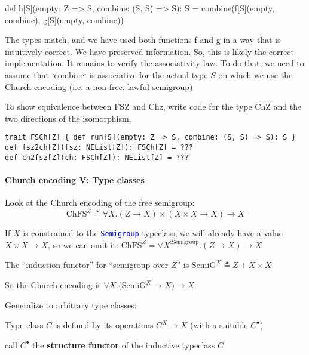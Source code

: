 def h{[}S{]}(empty: Z => S, combine: (S, S) => S): S = combine(f{[}S{]}(empty,
combine), g{[}S{]}(empty, combine))

The types match, and we have used both functions f and g in a way
that is intuitively correct. We have preserved information. So, this
is likely the correct implementation. It remains to verify the associativity
law. To do that, we need to assume that `combine` is associative for
the actual type $S$ on which we use the Church encoding (i.e. a non-free,
lawful semigroup)

To show equivalence between FSZ and Chz, write code for the type ChZ
and the two directions of the isomorphism,
\begin{lstlisting}
trait FSCh[Z] { def run[S](empty: Z => S, combine: (S, S) => S): S }
def fsz2ch[Z](fsz: NEList[Z]): FSCh[Z] = ???
def ch2fsz[Z](ch: FSCh[Z]): NEList[Z] = ???
\end{lstlisting}

\paragraph{Church encoding V: Type classes}

Look at the Church encoding of the free semigroup:{\footnotesize{}
\[
\text{ChFS}^{Z}\triangleq\forall X.\left(Z\rightarrow X\right)\times\left(X\times X\rightarrow X\right)\rightarrow X
\]
}{\footnotesize\par}

If $X$ is constrained to the \texttt{\textcolor{blue}{\footnotesize{}Semigroup}}
typeclass, we will already have a value {\footnotesize{}$X\times X\rightarrow X$},
so we can omit it: {\footnotesize{}$\text{ChFS}^{Z}=\forall X^{:\text{Semigroup}}.\left(Z\rightarrow X\right)\rightarrow X$}{\footnotesize\par}

The \textsf{``}induction functor\textsf{''} for \textsf{``}semigroup over $Z$\textsf{''} is {\footnotesize{}$\text{SemiG}^{X}\triangleq Z+X\times X$}{\footnotesize\par}

So the Church encoding is $\forall X.\big(\text{SemiG}^{X}\rightarrow X\big)\rightarrow X$

Generalize to arbitrary type classes:

Type class $C$ is defined by its operations{\footnotesize{} $C^{X}\rightarrow X$}
(with a suitable $C^{\bullet}$)

call $C^{\bullet}$ the \textbf{structure functor} of the inductive
typeclass $C$

